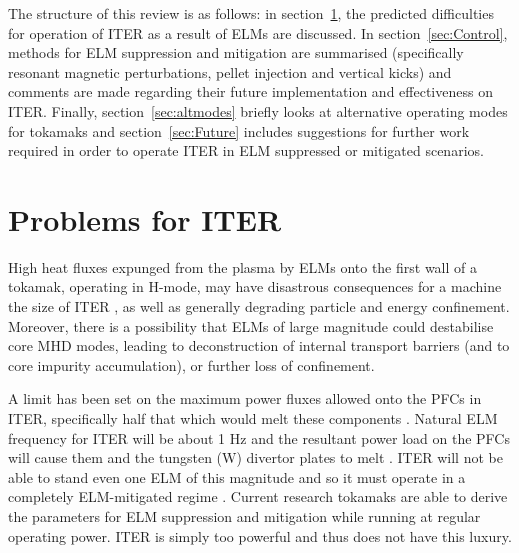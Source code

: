 \documentclass[11pt, twocolumn]{article}  %
\begin{document}
The structure of this review is as follows: in section~\ref{sec:Problems}, the predicted difficulties for operation of ITER as a result of ELMs are discussed. In section~\ref{sec:Control}, methods for ELM suppression and mitigation are summarised (specifically resonant magnetic perturbations, pellet injection and vertical kicks) and comments are made regarding their future implementation and effectiveness on ITER. Finally, section~\ref{sec:altmodes} briefly looks at alternative operating modes for tokamaks and section~\ref{sec:Future} includes suggestions for further work required in order to operate ITER in ELM suppressed or mitigated scenarios.


\section{Problems for ITER}\label{sec:Problems}
High heat fluxes expunged from the plasma by ELMs onto the first wall of a tokamak, operating in H-mode, may have disastrous consequences for a machine the size of ITER \cite{Connor2008}, as well as generally degrading particle and energy confinement. Moreover, there is a possibility that ELMs of large magnitude could destabilise core MHD modes, leading to deconstruction of internal transport barriers \cite{Connor2004} (and to core impurity accumulation), or further loss of confinement. 

A limit has been set on the maximum power fluxes allowed onto the PFCs in ITER, specifically half that which would melt these components \cite{Loarte2014a}. Natural ELM frequency for ITER will be about 1 Hz \cite{Loarte2014a} and the resultant power load on the PFCs will cause them and the tungsten (W) divertor plates to melt \cite{Federici2003}. ITER will not be able to stand even one ELM of this magnitude and so it must operate in a completely ELM-mitigated regime \cite{KirkFF}. Current research tokamaks are able to derive the parameters for ELM suppression and mitigation while running at regular operating power. ITER is simply too powerful and thus does not have this luxury.
\end{document}

